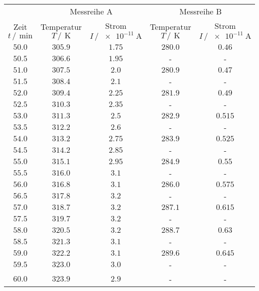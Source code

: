 \begin{table}
    \centering
    \begin{tabular}{c c c c c}
        \toprule
&\multicolumn{2}{c}{Messreihe A}&\multicolumn{2}{c}{Messreihe B}\\
Zeit $t \,/\,\SI{}{\minute}$&Temperatur $T \,/\,\SI{}{\kelvin}$ &Strom $I \,/\,\SI{e-11}{\ampere}$&Temperatur $T \,/\,\SI{}{\kelvin}$ &Strom $I \,/\,\SI{e-11}{\ampere}$\\
\midrule
        $\num{50.0}$&$\num{305.9}$&$\num{1.75}$&$\num{280.0}$&$\num{0.46}$\\
        $\num{50.5}$&$\num{306.6}$&$\num{1.95}$&-&-\\
        $\num{51.0}$&$\num{307.5}$&$\num{2.0}$&$\num{280.9}$&$\num{0.47}$\\
        $\num{51.5}$&$\num{308.4}$&$\num{2.1}$&-&-\\
        $\num{52.0}$&$\num{309.4}$&$\num{2.25}$&$\num{281.9}$&$\num{0.49}$\\
        $\num{52.5}$&$\num{310.3}$&$\num{2.35}$&-&-\\
        $\num{53.0}$&$\num{311.3}$&$\num{2.5}$&$\num{282.9}$&$\num{0.515}$\\
        $\num{53.5}$&$\num{312.2}$&$\num{2.6}$&-&-\\
        $\num{54.0}$&$\num{313.2}$&$\num{2.75}$&$\num{283.9}$&$\num{0.525}$\\
        $\num{54.5}$&$\num{314.2}$&$\num{2.85}$&-&-\\
        $\num{55.0}$&$\num{315.1}$&$\num{2.95}$&$\num{284.9}$&$\num{0.55}$\\
        $\num{55.5}$&$\num{316.0}$&$\num{3.1}$&-&-\\
        $\num{56.0}$&$\num{316.8}$&$\num{3.1}$&$\num{286.0}$&$\num{0.575}$\\
        $\num{56.5}$&$\num{317.8}$&$\num{3.2}$&-&-\\
        $\num{57.0}$&$\num{318.7}$&$\num{3.2}$&$\num{287.1}$&$\num{0.615}$\\
        $\num{57.5}$&$\num{319.7}$&$\num{3.2}$&-&-\\
        $\num{58.0}$&$\num{320.5}$&$\num{3.2}$&$\num{288.7}$&$\num{0.63}$\\
        $\num{58.5}$&$\num{321.3}$&$\num{3.1}$&-&-\\
        $\num{59.0}$&$\num{322.2}$&$\num{3.1}$&$\num{289.6}$&$\num{0.645}$\\
        $\num{59.5}$&$\num{323.0}$&$\num{3.0}$&-&-\\
        $\num{60.0}$&$\num{323.9}$&$\num{2.9}$&-&-\\

\end{tabular}
\end{table}
